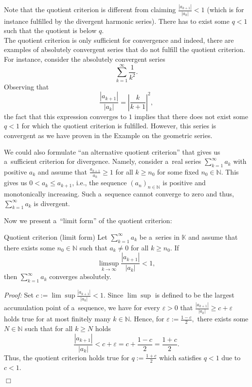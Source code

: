 \begin{Remark}{}
Note that the quotient criterion is different from claiming $\frac{|a_{k+1}|}{|a_{k}|}<1$ (which is for instance fulfilled by the divergent harmonic series). 
There has to exist some $q<1$ such that the quotient is below $q$.\\
The quotient criterion is only sufficient for convergence and indeed, there are examples of absolutely convergent 
series that do not fulfill the quotient criterion. For instance, consider the absolutely convergent series
\[\sum_{k=1}^\infty \frac1{k^2}.\]
Observing that
\[\frac{|a_{k+1}|}{|a_{k}|}=\left|\frac{k}{k+1}\right|^2,\]
the fact that this expression converges to $1$ implies that there does not exist some $q<1$ for which the quotient criterion is fulfilled.
However, this series is convergent as we have proven in the Example on the geometric series.

We could also formulate ``an alternative quotient criterion'' that gives us a~sufficient criterion for divergence. 
Namely, consider a~real series $\sum_{k=1}^\infty a_k$ with positive $a_k$ and assume that $\frac{a_{k+1}}{a_{k}}\geq 1$ 
for all $k\geq n_0$ for some fixed $n_0\in\mathbb{N}$. This gives us $0< a_{k}\leq a_{k+1}$, i.e., the sequence $(a_n)_{n\in\mathbb{N}}$ is positive and monotonically increasing. 
Such a~sequence cannot converge to zero and thus, $\sum_{k=1}^\infty a_k$ is divergent.
\end{Remark}
Now we present a~``limit form'' of the quotient criterion:
\begin{Theorem}{Quotient criterion (limit form)}
\label{thm:quotkritlim}
Let $\sum_{k=1}^\infty a_k$ be a~series in $\mathbb{K}$ and assume that there exists some $n_0\in \mathbb{N}$ such that $a_k\neq0$ for all $k\geq n_0$.
If\[\limsup_{k \rightarrow \infty} \frac{|a_{k+1}|}{|a_{k}|}<1,\]
then $\sum_{k=1}^\infty a_k$ converges absolutely.
\end{Theorem}
%
{\em Proof:} Set $c:=\lim\sup\frac{|a_{k+1}|}{|a_{k}|}<1$. Since $\lim\sup$ is defined to be the largest accumulation point of a~sequence, 
we have for every $\varepsilon>0$ that $\frac{|a_{k+1}|}{|a_{k}|}\geq c+\varepsilon$ holds true for at most finitely many $k\in\mathbb{N}$. 
Hence, for $\varepsilon:=\frac{1-c}2,$ there exists some $N\in\mathbb{N}$ such that for all $k\geq N$ holds
\[\frac{|a_{k+1}|}{|a_{k}|}<c+\varepsilon=c+\frac{1-c}2=\frac{1+c}2.\]
Thus, the quotient criterion holds true for $q:=\frac{1+c}2$ which satisfies $q<1$ due to $c<1$.

$\Box$

